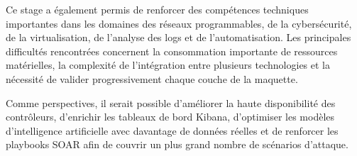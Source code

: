 \documentclass[12pt,a4paper,oneside]{report}
\begin{document}
Ce stage a également permis de renforcer des compétences techniques importantes dans les domaines des réseaux programmables, de la cybersécurité, de la virtualisation, de l'analyse des logs et de l'automatisation. Les principales difficultés rencontrées concernent la consommation importante de ressources matérielles, la complexité de l'intégration entre plusieurs technologies et la nécessité de valider progressivement chaque couche de la maquette.

Comme perspectives, il serait possible d'améliorer la haute disponibilité des contrôleurs, d'enrichir les tableaux de bord Kibana, d'optimiser les modèles d'intelligence artificielle avec davantage de données réelles et de renforcer les playbooks SOAR afin de couvrir un plus grand nombre de scénarios d'attaque.


\cleardoublepage
\end{document}

